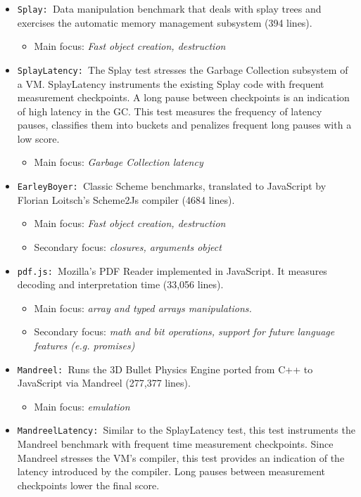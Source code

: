 \begin{itemize}
\begin{itemize}
  \end{itemize}
  \item \texttt{Splay: }Data manipulation benchmark that deals with splay trees and exercises the automatic memory management subsystem (394 lines).
  \begin{itemize}
    \item Main focus: \textit{Fast object creation, destruction}
  \end{itemize}
 \item \texttt{SplayLatency: }The Splay test stresses the Garbage Collection subsystem of a VM. SplayLatency instruments the existing Splay code with frequent measurement checkpoints. A long pause between checkpoints is an indication of high latency in the GC. This test measures the frequency of latency pauses, classifies them into buckets and penalizes frequent long pauses with a low score.
  \begin{itemize}
    \item Main focus: \textit{Garbage Collection latency}
  \end{itemize}
  \item \texttt{EarleyBoyer: }Classic Scheme benchmarks, translated to JavaScript by Florian Loitsch's Scheme2Js compiler (4684 lines).
  \begin{itemize}
    \item Main focus: \textit{Fast object creation, destruction}
    \item Secondary focus: \textit{closures, arguments object}
  \end{itemize}
  \item \texttt{pdf.js: }Mozilla's PDF Reader implemented in JavaScript. It measures decoding and interpretation time (33,056 lines).
  \begin{itemize}
    \item Main focus: \textit{array and typed arrays manipulations.}
    \item Secondary focus: \textit{math and bit operations, support for future language features (e.g. promises)}
  \end{itemize}
  \item \texttt{Mandreel: }Runs the 3D Bullet Physics Engine ported from C++ to JavaScript via Mandreel (277,377 lines).
  \begin{itemize}
    \item Main focus: \textit{emulation}
  \end{itemize}
  \item \texttt{MandreelLatency: }Similar to the SplayLatency test, this test instruments the Mandreel benchmark with frequent time measurement checkpoints. Since Mandreel stresses the VM's compiler, this test provides an indication of the latency introduced by the compiler. Long pauses between measurement checkpoints lower the final score.

\end{itemize}
